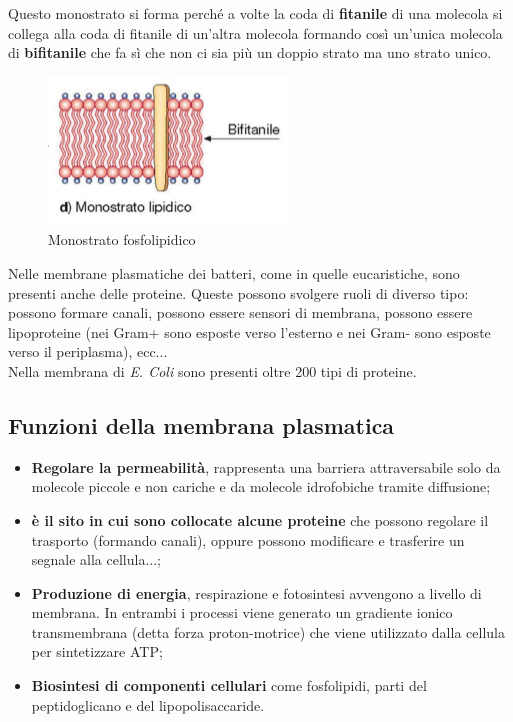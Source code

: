 \documentclass[11pt]{book}
\begin{document}
Questo monostrato si forma perché a volte la coda di \textbf{fitanile} di una molecola si collega alla coda di fitanile di un'altra molecola formando così un'unica molecola di \textbf{bifitanile} che fa sì che non ci sia più un doppio strato ma uno strato unico.

\begin{figure}[htp]
\centering
\includegraphics[scale=0.8]{img/Bifitanile.png}
\caption{Monostrato fosfolipidico}
\label{}
\end{figure}

\clearpage
Nelle membrane plasmatiche dei batteri, come in quelle eucaristiche, sono presenti anche delle proteine.
Queste possono svolgere ruoli di diverso tipo: possono formare canali, possono essere sensori di membrana, possono essere lipoproteine (nei Gram+ sono esposte verso l'esterno e nei Gram- sono esposte verso il periplasma), ecc...\\

Nella membrana di \emph{E. Coli} sono presenti oltre 200 tipi di proteine.

\subsection{Funzioni della membrana plasmatica}
\begin{itemize}
\item \textbf{Regolare la permeabilità}, rappresenta una barriera attraversabile solo da molecole piccole e non cariche e da molecole idrofobiche tramite diffusione;
\item \textbf{è il sito in cui sono collocate alcune proteine} che possono regolare il trasporto (formando canali), oppure possono modificare e trasferire un segnale alla cellula...;
\item \textbf{Produzione di energia}, respirazione e fotosintesi avvengono a livello di membrana. In entrambi i processi viene generato un gradiente ionico transmembrana (detta forza proton-motrice) che viene utilizzato dalla cellula per sintetizzare ATP;
\item \textbf{Biosintesi di componenti cellulari} come fosfolipidi, parti del peptidoglicano e del lipopolisaccaride.
\end{itemize}
\end{document}
